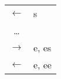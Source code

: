 \begin{tabular}{cl}
    $\leftarrow$ & s\\
    \dots & \\
    $\rightarrow$ & e, es\\
    $\leftarrow$ & e, ee
\end{tabular}